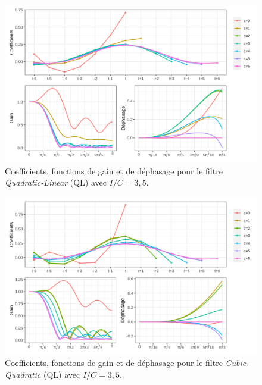 \documentclass[
  12pt,
  french,
  12pt,a4paper]{article}
\newcommand\1{\mathds{1}}
\begin{document}
\begin{figure}[H]

{\centering \includegraphics[width=1\linewidth]{img/filters_used/ql} 

}

\caption[Coefficients, fonctions de gain et de déphasage pour le filtre \emph{Quadratic-Linear} (QL) avec \(I/C=3,5\)]{Coefficients, fonctions de gain et de déphasage pour le filtre \emph{Quadratic-Linear} (QL) avec \(I/C=3,5\).}\label{fig:graphsql}

\footnotesize
\normalsize\end{figure}

\begin{figure}[H]

{\centering \includegraphics[width=1\linewidth]{img/filters_used/cq} 

}

\caption[Coefficients, fonctions de gain et de déphasage pour le filtre \emph{Cubic-Quadratic} (QL) avec \(I/C=3,5\)]{Coefficients, fonctions de gain et de déphasage pour le filtre \emph{Cubic-Quadratic} (QL) avec \(I/C=3,5\).}\label{fig:graphscq}

\footnotesize
\normalsize\end{figure}
\end{document}
